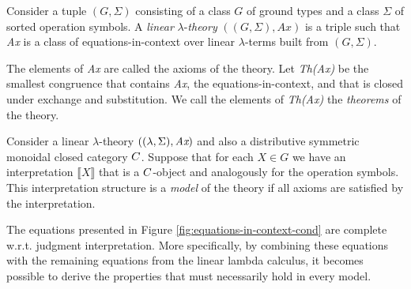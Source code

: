 \documentclass[a4paper,UKenglish,cleveref, autoref, thm-restate]{lipics-v2021}
\begin{document}
\begin{definition}
  Consider a tuple $(G, \Sigma)$ consisting of a class $G$ of ground types and a class $\Sigma$ of sorted operation symbols. A \emph{linear} $\lambda$-\emph{theory} $((G, \Sigma), \textit{Ax})$ is a triple such that \emph{Ax} is a class of equations-in-context over linear $\lambda$-terms built from $(G, \Sigma)$.
\end{definition}

The elements of \emph{Ax} are called the axioms of the theory. Let \emph{Th(Ax)}  be the smallest congruence that contains \emph{Ax}, the equations-in-context, and that is closed under exchange
and substitution. We call the elements of  \emph{Th(Ax)} the \emph{theorems} of the theory.

\begin{definition}
  Consider a linear $\lambda$-theory $((\lambda, \Sigma), \emph{Ax})$ and
  also a distributive symmetric monoidal closed category $\catC$. Suppose that for each $X \in G$ we have an interpretation $\llbracket X \rrbracket$
  that is a $\catC$-object and analogously for the operation symbols. This interpretation structure
  is a \emph{model} of the theory if all axioms are satisfied by the interpretation.
\end{definition}

\begin{theorem} \label {theorem:comp_eq_in_context}
  The equations presented in Figure \ref{fig:equations-in-context-cond} are complete w.r.t. judgment interpretation. More specifically, by combining these equations with the remaining equations from the linear lambda calculus, it becomes possible to derive the properties that must necessarily hold in every model.
\end{theorem}
\end{document}
